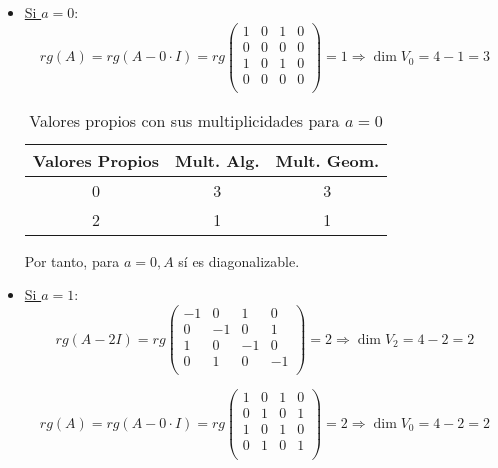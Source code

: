 \begin{ejercicio}
\begin{itemize}
        \item \underline{Si $a=0$}:\\
        \begin{equation*}
            rg(A) = rg(A-0\cdot I) = rg\left( \begin{array}{cccc}
            1 & 0 & 1 & 0 \\
            0 & 0 & 0 & 0 \\
            1 & 0 & 1 & 0 \\
            0 & 0 & 0 & 0 \\
        \end{array}\right) = 1 \Longrightarrow \dim V_0 = 4- 1 = 3
        \end{equation*}
        \begin{table}[H]
            \centering
            \begin{tabular}{c|c|c}
                Valores Propios & Mult. Alg. & Mult. Geom. \\ \hline 
                0 & 3 & 3\\
                2 & 1 & 1\\
            \end{tabular}
            \caption{Valores propios con sus multiplicidades para $a=0$}
        \end{table}
        Por tanto, para $a=0, A$ sí es diagonalizable.

        \item \underline{Si $a=1$}:\\
        \begin{equation*}
            rg(A-2I) = rg\left( \begin{array}{cccc}
            -1 & 0 & 1 & 0 \\
            0 & -1 & 0 & 1 \\
            1 & 0 & -1 & 0 \\
            0 & 1 & 0 & -1 \\
        \end{array}\right) = 2 \Longrightarrow \dim V_2 = 4- 2 = 2
        \end{equation*}

        \begin{equation*}
            rg(A) = rg(A-0\cdot I) = rg\left( \begin{array}{cccc}
            1 & 0 & 1 & 0 \\
            0 & 1 & 0 & 1 \\
            1 & 0 & 1 & 0 \\
            0 & 1 & 0 & 1 \\
        \end{array}\right) = 2 \Longrightarrow \dim V_0 = 4- 2 = 2
        \end{equation*}
        

\end{itemize}
\end{ejercicio}
